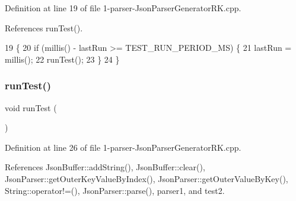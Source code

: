 Definition at line 19 of file 1-\/parser-\/\+Json\+Parser\+Generator\+R\+K.\+cpp.



References run\+Test().


\begin{DoxyCode}
19             \{
20     \textcolor{keywordflow}{if} (millis() - lastRun >= TEST_RUN_PERIOD_MS) \{
21         lastRun = millis();
22         runTest();
23     \}
24 \}
\end{DoxyCode}
\mbox{\label{1-parser-_json_parser_generator_r_k_8cpp_a822f652c6fc2f163c182a6e5fe922c23}} 
\subsubsection{run\+Test()}
{\footnotesize\ttfamily void run\+Test (\begin{DoxyParamCaption}{ }\end{DoxyParamCaption})}



Definition at line 26 of file 1-\/parser-\/\+Json\+Parser\+Generator\+R\+K.\+cpp.



References Json\+Buffer\+::add\+String(), Json\+Buffer\+::clear(), Json\+Parser\+::get\+Outer\+Key\+Value\+By\+Index(), Json\+Parser\+::get\+Outer\+Value\+By\+Key(), String\+::operator!=(), Json\+Parser\+::parse(), parser1, and test2.


